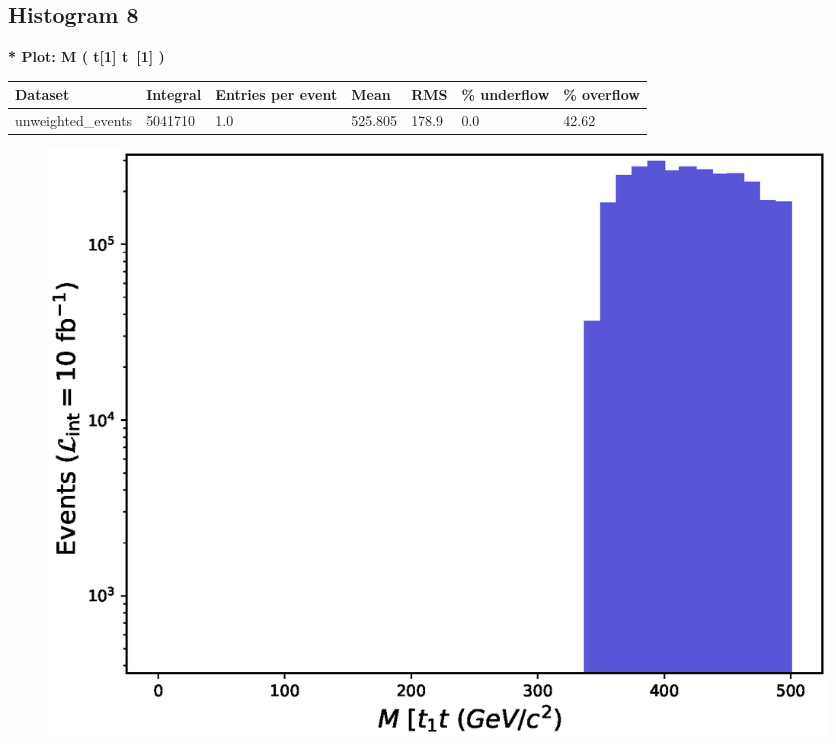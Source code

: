\documentclass[a4paper, 10pt]{article}
\begin{document}
\subsection{ Histogram 8}

\textbf{* Plot: M ( t[1] t~[1] ) }\\
   \begin{table}[H]
  \begin{center}
    \begin{tabular}{|m{23.0mm}|m{23.0mm}|m{18.0mm}|m{19.0mm}|m{19.0mm}|m{19.0mm}|m{19.0mm}|}
      \hline
      {\cellcolor{yellow}         Dataset}& {\cellcolor{yellow}         Integral}& {\cellcolor{yellow}         Entries per event}& {\cellcolor{yellow}         Mean}& {\cellcolor{yellow}         RMS}& {\cellcolor{yellow}         \% underflow}& {\cellcolor{yellow}         \% overflow}\\
      \hline
      {\cellcolor{white}         unweighted\_events}& {\cellcolor{white}         5041710}& {\cellcolor{white}         1.0}& {\cellcolor{white}         525.805}& {\cellcolor{white}         178.9}& {\cellcolor{red}         0.0}& {\cellcolor{red}         42.62}\\
\hline
    \end{tabular}
  \end{center}
\end{table}

\begin{figure}[H]
  \begin{center}
    \includegraphics[scale=0.45]{selection_7.eps}\\
\caption{   }
  \end{center}
\end{figure}
      \newpage
\end{document}
